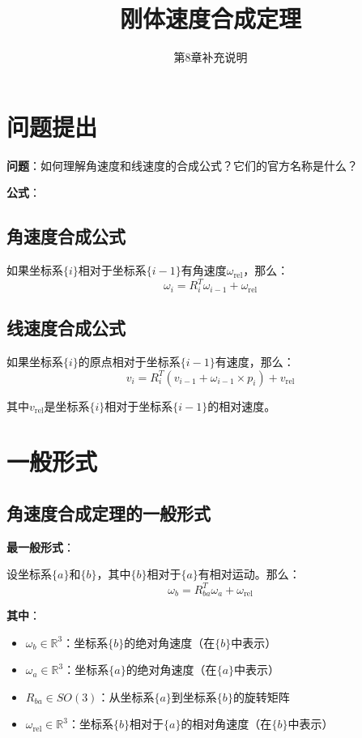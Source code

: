 \documentclass[12pt,a4paper]{article}
\title{刚体速度合成定理}
\author{第8章补充说明}
\date{}
\begin{document}
\maketitle

\section{问题提出}

\textbf{问题}：如何理解角速度和线速度的合成公式？它们的官方名称是什么？

\textbf{公式}：

\subsection{角速度合成公式}

如果坐标系$\{i\}$相对于坐标系$\{i-1\}$有角速度$\omega_{\text{rel}}$，那么：
\begin{equation}
\omega_i = R_i^T \omega_{i-1} + \omega_{\text{rel}} \tag{3}
\end{equation}

\subsection{线速度合成公式}

如果坐标系$\{i\}$的原点相对于坐标系$\{i-1\}$有速度，那么：
\begin{equation}
v_i = R_i^T (v_{i-1} + \omega_{i-1} \times p_i) + v_{\text{rel}} \tag{4}
\end{equation}

其中$v_{\text{rel}}$是坐标系$\{i\}$相对于坐标系$\{i-1\}$的相对速度。

\section{一般形式}

\subsection{角速度合成定理的一般形式}

\textbf{最一般形式}：

设坐标系$\{a\}$和$\{b\}$，其中$\{b\}$相对于$\{a\}$有相对运动。那么：
\begin{equation}
\omega_b = R_{ba}^T \omega_a + \omega_{\text{rel}} \tag{3-一般}
\end{equation}

\textbf{其中}：
\begin{itemize}
\item $\omega_b \in \mathbb{R}^3$：坐标系$\{b\}$的绝对角速度（在$\{b\}$中表示）
\item $\omega_a \in \mathbb{R}^3$：坐标系$\{a\}$的绝对角速度（在$\{a\}$中表示）
\item $R_{ba} \in SO(3)$：从坐标系$\{a\}$到坐标系$\{b\}$的旋转矩阵
\item $\omega_{\text{rel}} \in \mathbb{R}^3$：坐标系$\{b\}$相对于$\{a\}$的相对角速度（在$\{b\}$中表示）
\end{itemize}
\end{document}
